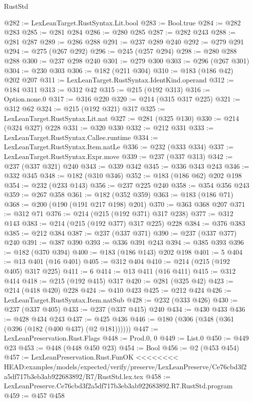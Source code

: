 \begin{lexlean}{RustStd}
\begin{coremodule}
{\begin{coremodule}
{{{{{{{{{@282 := LexLeanTarget.RustSyntax.Lit.bool
@283 := Bool.true
@284 := @282 @283
@285 := @281 @284
@286 := @280 @285
@287 := @282 @243
@288 := @281 @287
@289 := @286 @288
@291 := @237 @289 @240
@292 := @279 @291
@294 := @275 (@267 @292)
@296 := @245 (@257 @294)
@298 := @280 @288 @288
@300 := @237 @298 @240
@301 := @279 @300
@303 := @296 (@267 @301)
@304 := @230 @303
@306 := @182 (@211 @304)
@310 := @183 (@186 @42) @202 @207
@311 := LexLeanTarget.RustSyntax.IdentKind.operand
@312 := @184 @311
@313 := @312 @42
@315 := @215 (@192 @313)
@316 := Option.none.{0}
@317 := @316 @220
@320 := @214 (@315 @317 @225)
@321 := @312 @62
@324 := @215 (@192 @321) @317
@325 := LexLeanTarget.RustSyntax.Lit.nat
@327 := @281 (@325 @130)
@330 := @214 (@324 @327) @228
@331 := @320 @330
@332 := @212 @331
@333 := LexLeanTarget.RustSyntax.Callee.runtime
@334 := LexLeanTarget.RustSyntax.Item.natLe
@336 := @232 (@333 @334)
@337 := LexLeanTarget.RustSyntax.Expr.move
@339 := @237 (@337 @313)
@342 := @237 (@337 @321) @240
@343 := @339 @342
@345 := @336 @343 @243
@346 := @332 @345
@348 := @182 (@310 @346)
@352 := @183 (@186 @62) @202 @198
@354 := @232 (@233 @143)
@356 := @237 @225 @240
@358 := @354 @356 @243
@359 := @267 @358
@361 := @182 (@352 @359)
@363 := @183 (@186 @71)
@368 := @200 (@190 (@191 @217 @198) @201)
@370 := @363 @368 @207
@371 := @312 @71
@376 := @214 (@215 (@192 @371) @317 @238)
@377 := @312 @143
@383 := @214 (@215 (@192 @377) @317 @225) @228
@384 := @376 @383
@385 := @212 @384
@387 := @237 (@337 @371)
@390 := @237 (@337 @377) @240
@391 := @387 @390
@393 := @336 @391 @243
@394 := @385 @393
@396 := @182 (@370 @394)
@400 := @183 (@186 @143) @202 @198
@401 := 5
@404 := @13 @401 (@16 @401)
@405 := @312 @404
@410 := @214 (@215 (@192 @405) @317 @225)
@411 := 6
@414 := @13 @411 (@16 @411)
@415 := @312 @414
@418 := @215 (@192 @415) @317
@420 := @281 (@325 @42)
@423 := @214 (@418 @420) @228
@424 := @410 @423
@425 := @212 @424
@426 := LexLeanTarget.RustSyntax.Item.natSub
@428 := @232 (@333 @426)
@430 := @237 (@337 @405)
@433 := @237 (@337 @415) @240
@434 := @430 @433
@436 := @428 @434 @243
@437 := @425 @436
@446 := @180 (@306 (@348 (@361 (@396 (@182 (@400 @437) (@2 @181))))))
@447 := LexLeanPreservation.Rust.Flags
@448 := Prod.{0, 0}
@449 := List.{0}
@450 := @449 @23
@453 := @448 (@448 @450 @23)
@454 := Bool
@456 := @2 (@453 @454)
@457 := LexLeanPreservation.Rust.FunOK
<<<<<<<< HEAD:examples/models/expected/verify/preserve/LexLeanPreserve/Ce76cbd3f2a5df717b3eb3ab922683892/R7/RustStd.lex.tex
@458 := LexLeanPreserve.Ce76cbd3f2a5df717b3eb3ab922683892.R7.RustStd.program
@459 := @457 @458
}}}}}}}}}
\end{coremodule}}
\end{coremodule}
\end{lexlean}
